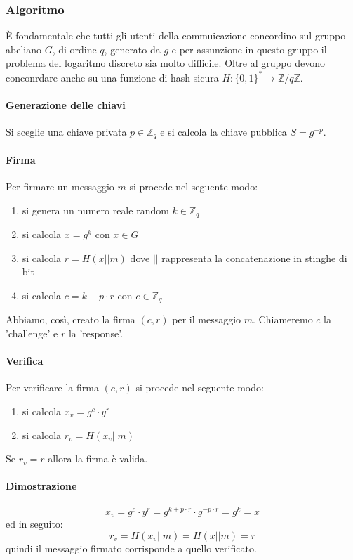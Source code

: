 \documentclass[12pt,a4paper]{article}
\begin{document}
\subsubsection{Algoritmo}

È fondamentale che tutti gli utenti della commuicazione concordino sul gruppo
abeliano $ G $, di ordine $ q $, generato da $ g $ e per assunzione in questo
gruppo il problema del logaritmo discreto sia molto difficile. Oltre al gruppo
devono conconrdare anche su una funzione di hash sicura $ H:\{0,1\}^*
\rightarrow \mathbb{Z} / q\mathbb{Z} $.

\paragraph{Generazione delle chiavi}
Si sceglie una chiave privata $ p \in \mathbb{Z}_q $ e si calcola la chiave
pubblica $ S = g^{-p} $.

\paragraph{Firma}
Per firmare un messaggio $ m $ si procede nel seguente modo:
\begin{enumerate}
    \item si genera un numero reale random $ k \in \mathbb{Z}_q $
    \item si calcola $ x = g^k $ con $ x \in G $ 
    \item si calcola $ r = H(x || m) $ dove $ || $ rappresenta la concatenazione
    in stinghe di bit
    \item si calcola $ c = k + p \cdot r $ con $ e \in \mathbb{Z}_q $
\end{enumerate}

Abbiamo, così, creato la firma $ (c, r) $ per il messaggio $ m $. Chiameremo $ c
$ la 'challenge' e $ r $ la 'response'.

\paragraph{Verifica}
Per verificare la firma $ (c, r) $ si procede nel seguente modo:
\begin{enumerate}
    \item si calcola $ x_v = g^c\cdot y^r $
    \item si calcola $ r_v = H(x_v || m) $
\end{enumerate}
Se $ r_v = r $ allora la firma è valida.

\paragraph{Dimostrazione}
$$ x_v = g^c\cdot y^r = g^{k + p\cdot r}\cdot g^{-p\cdot r} = g^k = x $$ ed in
seguito:
$$ r_v = H(x_v || m) = H(x || m) = r $$ quindi il messaggio firmato corrisponde
a quello verificato.
\end{document}
